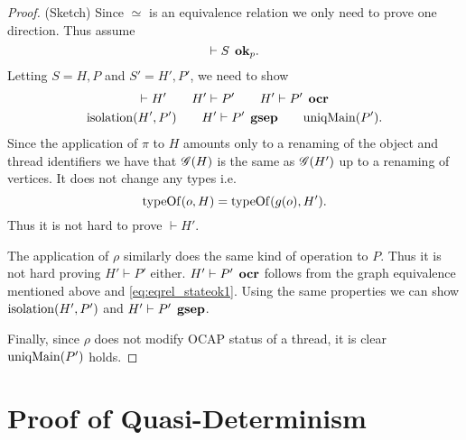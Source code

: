 \begin{proof}{(Sketch)}
  Since $\simeq$ is an equivalence relation we only need to prove one direction.
  Thus assume
  \begin{equation}
    \vdash S \:\: \mbox{{\bf ok}$_p$}.
  \end{equation}
  Letting $S = H, P$ and $S' = H', P'$, we need to show
  \begin{equation} 
    \begin{gathered}
      \vdash H' \quad\quad H' \vdash P' \quad\quad H' \vdash P' \:\: \mbox{\bf ocr} \\
      \mbox{$\mathrm{isolation}$}(H', P') \quad\quad H' \vdash P' \:\: \mbox{\bf gsep} \quad\quad \mbox{$\mathrm{uniqMain}$}(P').
    \end{gathered}
  \end{equation}
  Since the application of $\pi$ to $H$ amounts only to a renaming of the object
  and thread identifiers we have that $\mathscr{G}(H)$ is the same as $\mathscr{G}(H')$ up to a
  renaming of vertices. It does not change any types i.e. 
  \begin{equation} \label{eq:eqrel_stateok1}
    \mbox{$\mathrm{typeOf}$}(o, H) = \mbox{$\mathrm{typeOf}$}(g(o), H').
  \end{equation}
  Thus it is not hard to prove $\vdash H'$. 
  
  The application of $\rho$ similarly does the same kind of operation to $P$.
  Thus it is not hard proving $H' \vdash P'$ either.
  $H' \vdash P' \:\: \mbox{\bf ocr}$ follows from the graph equivalence mentioned above
  and \eqref{eq:eqrel_stateok1}. Using the same properties we can show
  $\mbox{$\mathrm{isolation}$}(H', P')$ and $H' \vdash P' \:\: \mbox{\bf gsep}$.

  Finally, since $\rho$ does not modify OCAP status of a thread, it is clear
  $\mbox{$\mathrm{uniqMain}$}(P')$ holds.
\end{proof}

\newpage
\section{Proof of Quasi-Determinism}
\label{sec:proof_of_quasi_determinism}

